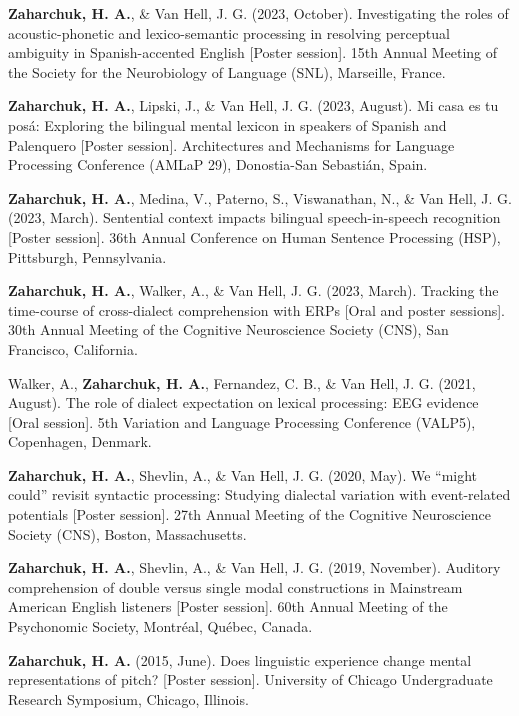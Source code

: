 \documentclass[11pt,a4paper,]{awesome-cv}
\newlength{\cslhangindent}
\newenvironment{CSLReferences}[2] %
 {\begin{list}{}{%
  \setlength{\itemindent}{0pt}
  \setlength{\leftmargin}{0pt}
  \setlength{\parsep}{0pt}
  \ifodd #1
   \setlength{\leftmargin}{\cslhangindent}
   \setlength{\itemindent}{-1\cslhangindent}
  \fi
  \setlength{\itemsep}{#2\baselineskip}}}
 {\end{list}}
\begin{document}
\begin{CSLReferences}{1}{0}
\textbf{\textbf{Zaharchuk, H.} A.}, \& Van Hell, J. G. (2023, October). Investigating the
roles of acoustic-phonetic and lexico-semantic processing in resolving
perceptual ambiguity in Spanish-accented English {[}Poster session{]}.
15th Annual Meeting of the Society for the Neurobiology of Language
(SNL), Marseille, France.

\textbf{\textbf{Zaharchuk, H.} A.}, Lipski, J., \& Van Hell, J. G. (2023, August). Mi casa
es tu posá: Exploring the bilingual mental lexicon in speakers of
Spanish and Palenquero {[}Poster session{]}. Architectures and
Mechanisms for Language Processing Conference (AMLaP 29), Donostia-San
Sebastián, Spain.

\textbf{\textbf{Zaharchuk, H.} A.}, Medina, V., Paterno, S., Viswanathan, N., \& Van Hell,
J. G. (2023, March). Sentential context impacts bilingual
speech-in-speech recognition {[}Poster session{]}. 36th Annual
Conference on Human Sentence Processing (HSP), Pittsburgh, Pennsylvania.

\textbf{\textbf{Zaharchuk, H.} A.}, Walker, A., \& Van Hell, J. G. (2023, March). Tracking
the time-course of cross-dialect comprehension with ERPs {[}Oral and
poster sessions{]}. 30th Annual Meeting of the Cognitive Neuroscience
Society (CNS), San Francisco, California.

Walker, A., \textbf{\textbf{Zaharchuk, H.} A.}, Fernandez, C. B., \& Van Hell, J. G.
(2021, August). The role of dialect expectation on lexical processing:
EEG evidence {[}Oral session{]}. 5th Variation and Language Processing
Conference (VALP5), Copenhagen, Denmark.

\textbf{\textbf{Zaharchuk, H.} A.}, Shevlin, A., \& Van Hell, J. G. (2020, May). We
{``might could''} revisit syntactic processing: Studying dialectal
variation with event-related potentials {[}Poster session{]}. 27th
Annual Meeting of the Cognitive Neuroscience Society (CNS), Boston,
Massachusetts.

\textbf{\textbf{Zaharchuk, H.} A.}, Shevlin, A., \& Van Hell, J. G. (2019, November).
Auditory comprehension of double versus single modal constructions in
Mainstream American English listeners {[}Poster session{]}. 60th Annual
Meeting of the Psychonomic Society, Montréal, Québec, Canada.

\textbf{\textbf{Zaharchuk, H.} A.} (2015, June). Does linguistic experience change mental
representations of pitch? {[}Poster session{]}. University of Chicago
Undergraduate Research Symposium, Chicago, Illinois.

\end{CSLReferences}
\end{document}
